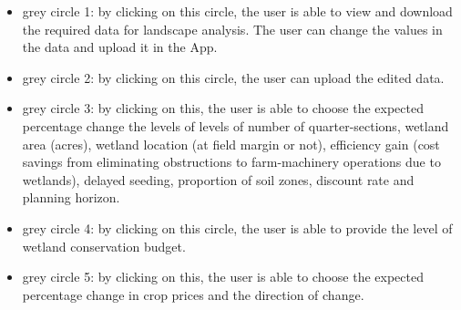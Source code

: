 \documentclass[
]{article}
\providecommand{\tightlist}{%
  \setlength{\itemsep}{0pt}\setlength{\parskip}{0pt}}
\begin{document}
\begin{itemize}
\tightlist
\item
  grey circle 1: by clicking on this circle, the user is able to view
  and download the required data for landscape analysis. The user can
  change the values in the data and upload it in the App.\\
\item
  grey circle 2: by clicking on this circle, the user can upload the
  edited data.\\
\item
  grey circle 3: by clicking on this, the user is able to choose the
  expected percentage change the levels of levels of number of
  quarter-sections, wetland area (acres), wetland location (at field
  margin or not), efficiency gain (cost savings from eliminating
  obstructions to farm-machinery operations due to wetlands), delayed
  seeding, proportion of soil zones, discount rate and planning horizon.
\item
  grey circle 4: by clicking on this circle, the user is able to provide
  the level of wetland conservation budget.\\
\item
  grey circle 5: by clicking on this, the user is able to choose the
  expected percentage change in crop prices and the direction of change.
\end{itemize}
\end{document}
